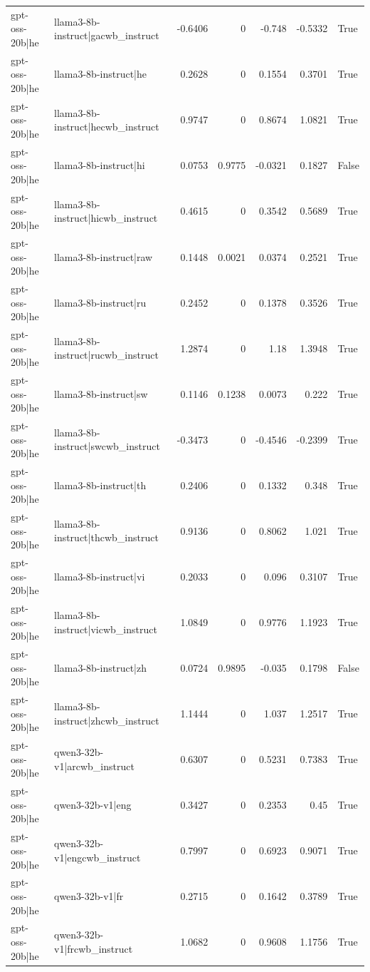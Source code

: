 \begin{table}
\begin{tabular}{l l r r r r l}
gpt-oss-20b|he & llama3-8b-instruct|gacwb_instruct & -0.6406 & 0 & -0.748 & -0.5332 & True \\
gpt-oss-20b|he & llama3-8b-instruct|he & 0.2628 & 0 & 0.1554 & 0.3701 & True \\
gpt-oss-20b|he & llama3-8b-instruct|hecwb_instruct & 0.9747 & 0 & 0.8674 & 1.0821 & True \\
gpt-oss-20b|he & llama3-8b-instruct|hi & 0.0753 & 0.9775 & -0.0321 & 0.1827 & False \\
gpt-oss-20b|he & llama3-8b-instruct|hicwb_instruct & 0.4615 & 0 & 0.3542 & 0.5689 & True \\
gpt-oss-20b|he & llama3-8b-instruct|raw & 0.1448 & 0.0021 & 0.0374 & 0.2521 & True \\
gpt-oss-20b|he & llama3-8b-instruct|ru & 0.2452 & 0 & 0.1378 & 0.3526 & True \\
gpt-oss-20b|he & llama3-8b-instruct|rucwb_instruct & 1.2874 & 0 & 1.18 & 1.3948 & True \\
gpt-oss-20b|he & llama3-8b-instruct|sw & 0.1146 & 0.1238 & 0.0073 & 0.222 & True \\
gpt-oss-20b|he & llama3-8b-instruct|swcwb_instruct & -0.3473 & 0 & -0.4546 & -0.2399 & True \\
gpt-oss-20b|he & llama3-8b-instruct|th & 0.2406 & 0 & 0.1332 & 0.348 & True \\
gpt-oss-20b|he & llama3-8b-instruct|thcwb_instruct & 0.9136 & 0 & 0.8062 & 1.021 & True \\
gpt-oss-20b|he & llama3-8b-instruct|vi & 0.2033 & 0 & 0.096 & 0.3107 & True \\
gpt-oss-20b|he & llama3-8b-instruct|vicwb_instruct & 1.0849 & 0 & 0.9776 & 1.1923 & True \\
gpt-oss-20b|he & llama3-8b-instruct|zh & 0.0724 & 0.9895 & -0.035 & 0.1798 & False \\
gpt-oss-20b|he & llama3-8b-instruct|zhcwb_instruct & 1.1444 & 0 & 1.037 & 1.2517 & True \\
gpt-oss-20b|he & qwen3-32b-v1|arcwb_instruct & 0.6307 & 0 & 0.5231 & 0.7383 & True \\
gpt-oss-20b|he & qwen3-32b-v1|eng & 0.3427 & 0 & 0.2353 & 0.45 & True \\
gpt-oss-20b|he & qwen3-32b-v1|engcwb_instruct & 0.7997 & 0 & 0.6923 & 0.9071 & True \\
gpt-oss-20b|he & qwen3-32b-v1|fr & 0.2715 & 0 & 0.1642 & 0.3789 & True \\
gpt-oss-20b|he & qwen3-32b-v1|frcwb_instruct & 1.0682 & 0 & 0.9608 & 1.1756 & True \\

\end{tabular}
\end{table}
